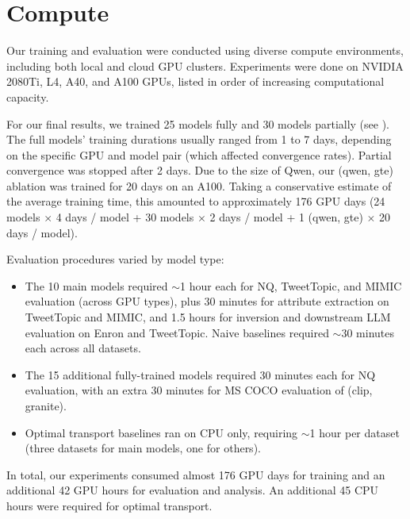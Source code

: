 \section{Compute}
\label{sec:compute}
Our training and evaluation were conducted using diverse compute environments, including both local and cloud GPU clusters. Experiments were done on NVIDIA 2080Ti, L4, A40, and A100 GPUs, listed in order of increasing computational capacity.

For our final results, we trained 25 \atk{} models fully and 30 models partially (see ). The full models' training durations usually ranged from 1 to 7 days, depending on the specific GPU and model pair (which affected convergence rates). Partial convergence was stopped after 2 days. Due to the size of Qwen, our (qwen, gte) ablation was trained for 20 days on an A100.  Taking a conservative estimate of the average training time, this amounted to approximately 176 GPU days (24 models $\times$ 4 days / model + 30 models $\times$ 2 days / model + 1 (qwen, gte) $\times$ 20 days / model).

Evaluation procedures varied by model type:
\begin{itemize}
    \item The 10 main \atk{} models required $\sim$1 hour each for NQ, TweetTopic, and MIMIC evaluation (across GPU types), plus 30 minutes for attribute extraction on TweetTopic and MIMIC, and 1.5 hours for inversion and downstream LLM evaluation on Enron and TweetTopic. Naive baselines required $\sim$30 minutes each across all datasets.
    \item The 15 additional fully-trained models required 30 minutes each for NQ evaluation, with an extra 30 minutes for MS COCO evaluation of (clip, granite).
    \item Optimal transport baselines ran on CPU only, requiring $\sim$1 hour per dataset (three datasets for main models, one for others).
\end{itemize}

In total, our experiments consumed almost 176 GPU days for training and an additional 42 GPU hours for evaluation and analysis. An additional 45 CPU hours were required for optimal transport.

